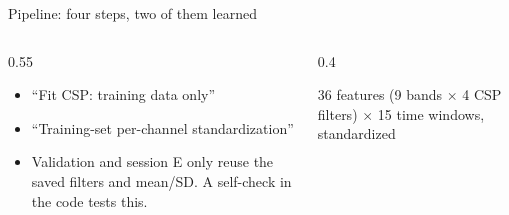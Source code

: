 \begin{frame}{Pipeline: four steps, two of them learned}
\medskip
\begin{columns}[T]
\begin{column}{0.55\textwidth}
\begin{keybox}
\begin{itemize}
\item ``Fit CSP: training data only'' 
\item ``Training-set per-channel standardization'' 
\item Validation and session E only reuse the saved filters and mean/SD. A self-check in the code tests this.
\end{itemize}
\end{keybox}
\end{column}
\begin{column}{0.4\textwidth}
\begin{qbox}
36 features (9 bands $\times$ 4 CSP filters) $\times$ 15 time windows, standardized
\end{qbox}
\end{column}
\end{columns}
\end{frame}


